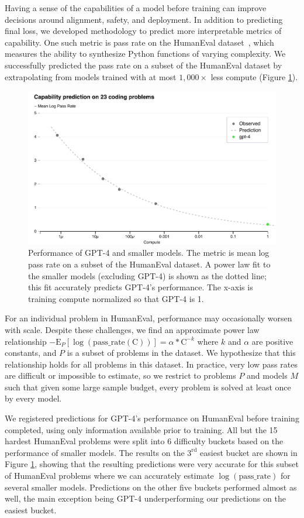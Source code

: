 \documentclass{article}
\begin{document}
Having a sense of the capabilities of a model before training can improve decisions around alignment, safety, and deployment. In addition to predicting final loss, we developed methodology to predict more interpretable metrics of capability. One such metric is pass rate on the HumanEval dataset~\citep{chen2021codex}, which measures the ability to synthesize Python functions of varying complexity. We successfully predicted the pass rate on a subset of the HumanEval dataset by extrapolating from models trained with at most $1,000\times$ less compute (Figure \ref{fig:predictable_scaling_humaneval}).

\begin{figure}[htbp]
    \centering
    \includegraphics[width=0.8\linewidth]{assets/capability_pred}
    \caption{Performance of GPT-4 and smaller models. The metric is mean log pass rate on a subset of the HumanEval dataset. A power law fit to the smaller models (excluding GPT-4) is shown as the dotted line; this fit accurately predicts GPT-4's performance. The x-axis is training compute normalized so that GPT-4 is 1. 
    }
    \label{fig:predictable_scaling_humaneval}
\end{figure}


For an individual problem in HumanEval, performance may occasionally worsen with scale. Despite these challenges, we find an approximate power law relationship $-\mathrm{E}_{P}[\log(\mathrm{pass\_rate(C)})] = \alpha*\mathrm{C}^{-k}$ where $k$ and $\alpha$ are positive constants, and $P$ is a subset of problems in the dataset.  We hypothesize that this relationship holds for all problems in this dataset.  In practice, very low pass rates are difficult or impossible to estimate, so we restrict to problems $P$ and models $M$ such that given some large sample budget, every problem is solved at least once by every model.

We registered predictions for GPT-4's performance on HumanEval before training completed, using only information available prior to training.  All but the 15 hardest HumanEval problems were split into 6 difficulty buckets based on the performance of smaller models.  The results on the $3^\mathrm{rd}$ easiest bucket are shown in Figure \ref{fig:predictable_scaling_humaneval}, showing that the resulting predictions were very accurate for this subset of HumanEval problems where we can accurately estimate $\log(\mathrm{pass\_rate})$ for several smaller models. Predictions on the other five buckets performed almost as well, the main exception being GPT-4 underperforming our predictions on the easiest bucket.
\end{document}
